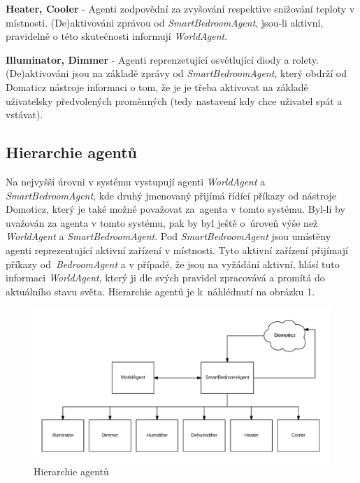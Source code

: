 \documentclass[a4paper,12pt]{article}
\begin{document}
    \textbf{Heater, Cooler} - Agenti zodpovědní za zvyšování respektive snižování teploty v místnosti. (De)aktivováni zprávou od \textit{SmartBedroomAgent}, jsou-li aktivní, pravidelně o této skutečnosti informují \textit{WorldAgent}.
    
    \textbf{Illuminator, Dimmer} - Agenti reprenzetující osvětlující diody a rolety. (De)aktivováni jsou na základě zprávy od \textit{SmartBedroomAgent}, který obdrží od Domaticz nástroje informaci o tom, že je je třeba aktivovat na základě uživatelsky předvolených proměnných (tedy nastavení kdy chce uživatel spát a vstávat).

    \subsection{Hierarchie agentů}
    Na nejvyšší úrovni v systému vystupují agenti \textit{WorldAgent} a \textit{SmartBedroomAgent}, kde druhý jmenovaný přijímá řídící příkazy od nástroje Domoticz, který je také možné považovat za~agenta v tomto systému. Byl-li by uvažován za agenta v tomto systému, pak by byl ještě o~úroveň výše než \textit{WorldAgent} a \textit{SmartBedroomAgent}. Pod \textit{SmartBedroomAgent} jsou umístěny agenti reprezentující aktivní zařízení v místnosti. Tyto aktivní zařízení přijímají příkazy od~\textit{BedroomAgent} a v případě, že jsou na vyžádání aktivní, hlásí tuto informaci \textit{WorldAgent}, který ji dle svých pravidel zpracovává a promítá do aktuálního stavu světa. Hierarchie agentů je k~náhlédnutí na obrázku 1.

    \begin{figure}[h!]
        \includegraphics[scale=0.22]{resources/AgentHierarchy.png}
        \caption{Hierarchie agentů}
    \end{figure}


	
\end{document}
